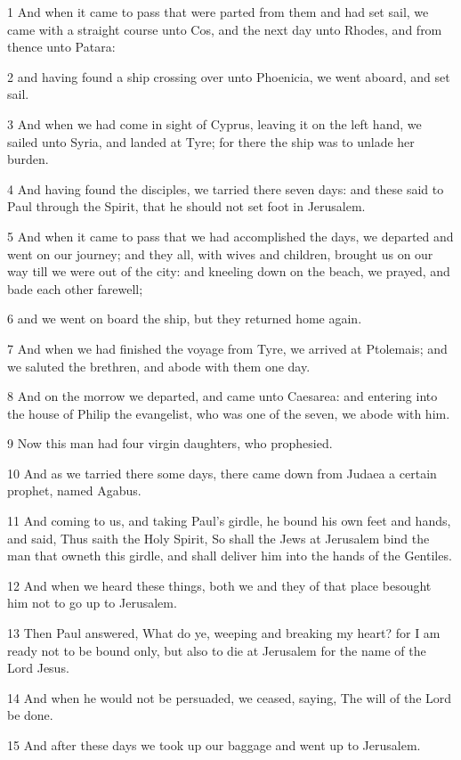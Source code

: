 \par 1 And when it came to pass that were parted from them and had set sail, we came with a straight course unto Cos, and the next day unto Rhodes, and from thence unto Patara:
\par 2 and having found a ship crossing over unto Phoenicia, we went aboard, and set sail.
\par 3 And when we had come in sight of Cyprus, leaving it on the left hand, we sailed unto Syria, and landed at Tyre; for there the ship was to unlade her burden.
\par 4 And having found the disciples, we tarried there seven days: and these said to Paul through the Spirit, that he should not set foot in Jerusalem.
\par 5 And when it came to pass that we had accomplished the days, we departed and went on our journey; and they all, with wives and children, brought us on our way till we were out of the city: and kneeling down on the beach, we prayed, and bade each other farewell;
\par 6 and we went on board the ship, but they returned home again.
\par 7 And when we had finished the voyage from Tyre, we arrived at Ptolemais; and we saluted the brethren, and abode with them one day.
\par 8 And on the morrow we departed, and came unto Caesarea: and entering into the house of Philip the evangelist, who was one of the seven, we abode with him.
\par 9 Now this man had four virgin daughters, who prophesied.
\par 10 And as we tarried there some days, there came down from Judaea a certain prophet, named Agabus.
\par 11 And coming to us, and taking Paul's girdle, he bound his own feet and hands, and said, Thus saith the Holy Spirit, So shall the Jews at Jerusalem bind the man that owneth this girdle, and shall deliver him into the hands of the Gentiles.
\par 12 And when we heard these things, both we and they of that place besought him not to go up to Jerusalem.
\par 13 Then Paul answered, What do ye, weeping and breaking my heart? for I am ready not to be bound only, but also to die at Jerusalem for the name of the Lord Jesus.
\par 14 And when he would not be persuaded, we ceased, saying, The will of the Lord be done.
\par 15 And after these days we took up our baggage and went up to Jerusalem.
